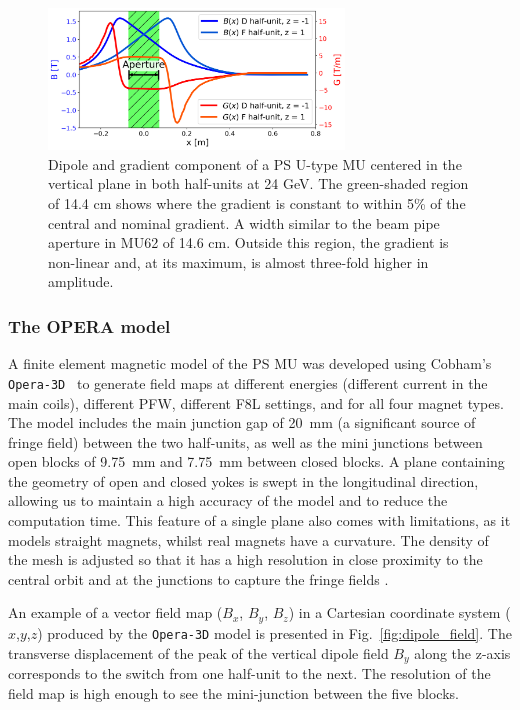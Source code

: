 \begin{figure}[H]
\centering
\includegraphics[width=0.7\textwidth]{01_Introduction/images/dipole_gradient_components.png}
\caption{Dipole and gradient component of a PS U-type MU centered in the vertical plane in both half-units at 24 GeV. The green-shaded region of 14.4 cm shows where the gradient is constant to within 5\% of the central and nominal gradient. A width similar to the beam pipe aperture in MU62 of 14.6 cm. Outside this region, the gradient is non-linear and, at its maximum, is almost three-fold higher in amplitude.}
\label{fig:dipole_gradient_components}
\end{figure}

\subsubsection{The OPERA model}

A finite element magnetic model of the PS MU was developed using Cobham's \texttt{Opera-3D}~\cite{noauthor_opera_nodate, anglada_pxmu_hrcwp_nodate} to generate field maps at different energies (different current in the main coils), different PFW, different F8L settings, and for all four magnet types. The model includes the main junction gap of \SI{20}{mm} (a significant source of fringe field) between the two half-units, as well as the mini junctions between open blocks of \SI{9.75}{mm} and \SI{7.75}{mm} between closed blocks. A plane containing the geometry of open and closed yokes is swept in the longitudinal direction, allowing us to maintain a high accuracy of the model and to reduce the computation time. This feature of a single plane also comes with limitations, as it models straight magnets, whilst real magnets have a curvature. The density of the mesh is adjusted so that it has a high resolution in close proximity to the central orbit and at the junctions to capture the fringe fields \cite{anglada_reference_2019}.

An example of a vector field map ($B_x$, $B_y$, $B_z$) in a Cartesian coordinate system ($x$,$y$,$z$) produced by the \texttt{Opera-3D} model is presented in Fig.~\ref{fig:dipole_field}. The transverse displacement of the peak of the vertical dipole field $B_{y}$ along the z-axis corresponds to the switch from one half-unit to the next. The resolution of the field map is high enough to see the mini-junction between the five blocks.


